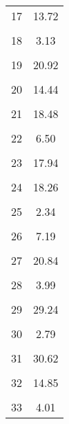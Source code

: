 \begin{table}[htbp]
\begin{tabular}{l*{1}{c}}
17                  &       13.72\\
                    &            \\
[1em]
18                  &        3.13\\
                    &            \\
[1em]
19                  &       20.92\\
                    &            \\
[1em]
20                  &       14.44\\
                    &            \\
[1em]
21                  &       18.48\\
                    &            \\
[1em]
22                  &        6.50\\
                    &            \\
[1em]
23                  &       17.94\\
                    &            \\
[1em]
24                  &       18.26\\
                    &            \\
[1em]
25                  &        2.34\\
                    &            \\
[1em]
26                  &        7.19\\
                    &            \\
[1em]
27                  &       20.84\\
                    &            \\
[1em]
28                  &        3.99\\
                    &            \\
[1em]
29                  &       29.24\\
                    &            \\
[1em]
30                  &        2.79\\
                    &            \\
[1em]
31                  &       30.62\\
                    &            \\
[1em]
32                  &       14.85\\
                    &            \\
[1em]
33                  &        4.01\\

\end{tabular}
\end{table}
